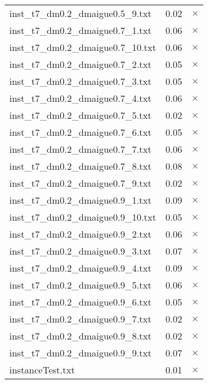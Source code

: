 \documentclass{article}
\begin{document}
\begin{center}
\begin{tabular}{lrr}
inst\_t7\_dm0.2\_dmaigue0.5\_9.txt & 0.02 & 
$\times$
\\
inst\_t7\_dm0.2\_dmaigue0.7\_1.txt & 0.06 & 
$\times$
\\
inst\_t7\_dm0.2\_dmaigue0.7\_10.txt & 0.06 & 
$\times$
\\
inst\_t7\_dm0.2\_dmaigue0.7\_2.txt & 0.05 & 
$\times$
\\
inst\_t7\_dm0.2\_dmaigue0.7\_3.txt & 0.05 & 
$\times$
\\
inst\_t7\_dm0.2\_dmaigue0.7\_4.txt & 0.06 & 
$\times$
\\
inst\_t7\_dm0.2\_dmaigue0.7\_5.txt & 0.02 & 
$\times$
\\
inst\_t7\_dm0.2\_dmaigue0.7\_6.txt & 0.05 & 
$\times$
\\
inst\_t7\_dm0.2\_dmaigue0.7\_7.txt & 0.06 & 
$\times$
\\
inst\_t7\_dm0.2\_dmaigue0.7\_8.txt & 0.08 & 
$\times$
\\
inst\_t7\_dm0.2\_dmaigue0.7\_9.txt & 0.02 & 
$\times$
\\
inst\_t7\_dm0.2\_dmaigue0.9\_1.txt & 0.09 & 
$\times$
\\
inst\_t7\_dm0.2\_dmaigue0.9\_10.txt & 0.05 & 
$\times$
\\
inst\_t7\_dm0.2\_dmaigue0.9\_2.txt & 0.06 & 
$\times$
\\
inst\_t7\_dm0.2\_dmaigue0.9\_3.txt & 0.07 & 
$\times$
\\
inst\_t7\_dm0.2\_dmaigue0.9\_4.txt & 0.09 & 
$\times$
\\
inst\_t7\_dm0.2\_dmaigue0.9\_5.txt & 0.06 & 
$\times$
\\
inst\_t7\_dm0.2\_dmaigue0.9\_6.txt & 0.05 & 
$\times$
\\
inst\_t7\_dm0.2\_dmaigue0.9\_7.txt & 0.02 & 
$\times$
\\
inst\_t7\_dm0.2\_dmaigue0.9\_8.txt & 0.02 & 
$\times$
\\
inst\_t7\_dm0.2\_dmaigue0.9\_9.txt & 0.07 & 
$\times$
\\
instanceTest.txt & 0.01 & 
$\times$
\\
\hline\end{tabular}
\end{center}
\end{document}
